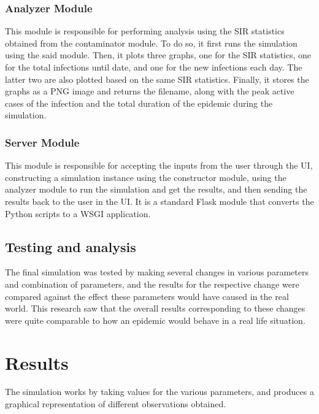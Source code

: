 \documentclass[conference]{IEEEtran}
\begin{document}
		\subsubsection{Analyzer Module}
		    This module is responsible for performing analysis using the SIR statistics obtained from the contaminator module. To do so, it first runs the simulation using the said module. Then, it plots three graphs, one for the SIR statistics, one for the total infections until date, and one for the new infections each day. The latter two are also plotted based on the same SIR statistics. Finally, it stores the graphs as a PNG image and returns the filename, along with the peak active cases of the infection and the total duration of the epidemic during the simulation.\\
		\subsubsection{Server Module}
			This module is responsible for accepting the inputs from the user through the UI, constructing a simulation instance using the constructor module, using the analyzer module to run the simulation and get the results, and then sending the results back to the user in the UI. It is a standard Flask module that converts the Python scripts to a WSGI application.
    \subsection{Testing and analysis}
    The final simulation was tested by making several changes in various parameters and combination of parameters, and the results for the respective change were compared against the effect these parameters would have caused in the real world. This research saw that the overall results corresponding to these changes were quite comparable to how an epidemic would behave in a real life situation.\\

    \section{Results}
    The simulation works by taking values for the various parameters, and produces a graphical representation of different observations obtained.
\end{document}
